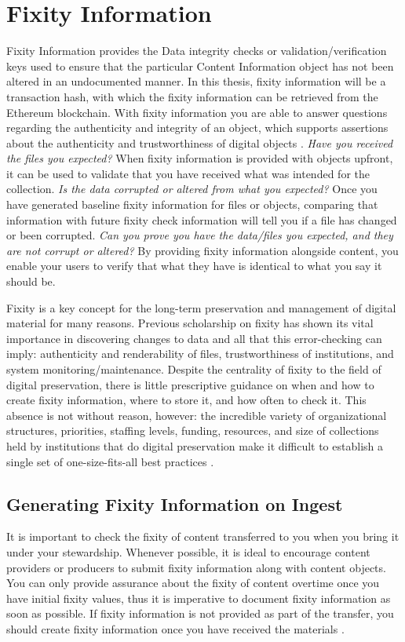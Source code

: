 \section{Fixity Information}
Fixity Information provides the Data integrity checks or validation/verification keys used to ensure that the particular Content Information object has not been altered in an undocumented manner\cite[8]{lee2010open}. In this thesis, fixity information will be a transaction hash, with which the fixity information can be retrieved from the Ethereum blockchain.
With fixity information you are able to answer questions regarding the authenticity and integrity of an object, which supports assertions about the authenticity and trustworthiness of digital objects \cite[3]{ndsa2017fixity}.
\newline \textit{Have you received the files you expected?} When fixity information is provided with objects upfront, it can be used to validate that you have received what was intended for the collection.
\newline \textit{Is the data corrupted or altered from what you expected?}  Once you have generated baseline fixity information for files or objects, comparing that information with future fixity check information will tell you if a file has changed or been corrupted.
\newline \textit{Can you prove you have the data/files you expected, and they are not corrupt or altered?} By providing fixity information alongside content, you enable your users to verify that what they have is identical to what you say it should be. 

Fixity is a key concept for the long-term preservation and management of digital material for many reasons. Previous scholarship on fixity has shown its vital importance in discovering changes to data and all that this error-checking can imply: authenticity and renderability of files, trustworthiness of institutions, and system monitoring/maintenance. Despite the centrality of fixity to the field of digital preservation, there is little prescriptive guidance on when and how to create fixity information, where to store it, and how often to check it. This absence is not without reason, however: the incredible variety of organizational structures, priorities, staffing levels, funding, resources, and size of collections held by institutions that do digital preservation make it difficult to establish a single set of one-size-fits-all best practices \cite[38]{ndsa2017fixity}.
\subsection{Generating Fixity Information on Ingest}
 It is important to check the fixity
of content transferred to you when you bring it under your stewardship. Whenever possible, it is ideal to encourage content providers or producers to submit fixity information along with content objects. You can only provide assurance about the fixity of content overtime once you have initial fixity values, thus it is imperative to document fixity information as soon as possible. If fixity information is not provided as part of the transfer, you should create fixity information once you have received the materials \cite[4]{ndsa2014fixity}.

